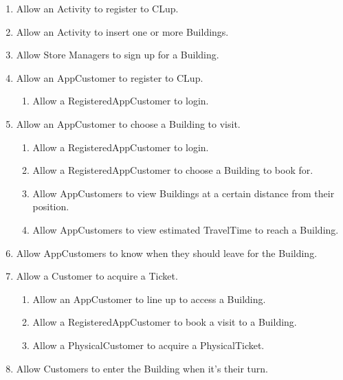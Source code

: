 \documentclass{article}
\begin{document}
	 \begin{enumerate} 
         	\item Allow an Activity to register to CLup.
		\item Allow an Activity to insert one or more Buildings.
		\item Allow Store Managers to sign up for a Building.
		\item Allow an AppCustomer to register to CLup.
		\renewcommand{\labelenumii}{\theenumii}
		\renewcommand{\theenumi}{G\,\arabic{enumi}}
		\renewcommand{\theenumii}{[\theenumi.\arabic{enumii}].}
		\begin{enumerate}
			\item Allow a RegisteredAppCustomer to login.
		\end{enumerate}
		\renewcommand{\theenumi}{[G\,\arabic{enumi}]}
		\item Allow an AppCustomer to choose a Building to visit.
		\renewcommand{\labelenumii}{\theenumii}
		\renewcommand{\theenumi}{G\,\arabic{enumi}}
		\renewcommand{\theenumii}{[\theenumi.\arabic{enumii}].}
		\begin{enumerate}
			\item Allow a RegisteredAppCustomer to login.
			\item Allow a RegisteredAppCustomer to choose a Building to book for.
			\item Allow AppCustomers to view Buildings at a certain distance from their position. 
			\item Allow AppCustomers to view estimated TravelTime to reach a Building.
		\end{enumerate}
		\renewcommand{\theenumi}{[G\,\arabic{enumi}]}
		\item Allow AppCustomers to know when they should leave for the Building.
		\item Allow a Customer to acquire a Ticket.
		\renewcommand{\labelenumii}{\theenumii}
		\renewcommand{\theenumi}{G\,\arabic{enumi}}
		\renewcommand{\theenumii}{[\theenumi.\arabic{enumii}].}
		\begin{enumerate}
			\item Allow an AppCustomer to line up to access a Building. 
			\item Allow a RegisteredAppCustomer to book a visit to a Building.
			\item Allow a PhysicalCustomer to acquire a PhysicalTicket.
		\end{enumerate}
		\renewcommand{\theenumi}{[G\,\arabic{enumi}]}
		\item  Allow Customers to enter the Building when it’s their turn.

\end{enumerate}
\end{document}
